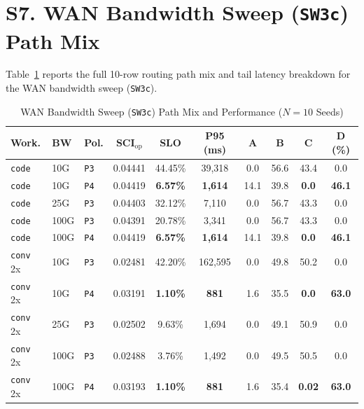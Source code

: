 \documentclass[11pt,a4paper]{article}
\begin{document}
\section*{S7. WAN Bandwidth Sweep (\texttt{SW3c}) Path Mix}
Table~\ref{tab:supp_wan_pathmix} reports the full 10-row routing path mix and tail latency breakdown for the WAN bandwidth sweep (\texttt{SW3c}).

\begin{table}[ht]
\centering
\scriptsize
\caption{WAN Bandwidth Sweep (\texttt{SW3c}) Path Mix and Performance ($N=10$ Seeds)}
\label{tab:supp_wan_pathmix}
\begin{tabular}{@{}lllccccccc@{}}
\toprule
\textbf{Work.} & \textbf{BW} & \textbf{Pol.} & $\textbf{SCI}_{\text{op}}$ & \textbf{SLO} & \textbf{P95 (ms)} & \textbf{A} & \textbf{B} & \textbf{C} & \textbf{D (\%)} \\
\midrule
\texttt{code} & 10G & \texttt{P3} & 0.04441 & 44.45\% & 39,318 & 0.0 & 56.6 & 43.4 & 0.0 \\
\texttt{code} & 10G & \texttt{P4} & 0.04419 & \textbf{6.57\%} & \textbf{1,614} & 14.1 & 39.8 & \textbf{0.0} & \textbf{46.1} \\
\texttt{code} & 25G & \texttt{P3} & 0.04403 & 32.12\% & 7,110 & 0.0 & 56.7 & 43.3 & 0.0 \\
\texttt{code} & 100G & \texttt{P3} & 0.04391 & 20.78\% & 3,341 & 0.0 & 56.7 & 43.3 & 0.0 \\
\texttt{code} & 100G & \texttt{P4} & 0.04419 & \textbf{6.57\%} & \textbf{1,614} & 14.1 & 39.8 & \textbf{0.0} & \textbf{46.1} \\
\midrule
\texttt{conv} 2x & 10G & \texttt{P3} & 0.02481 & 42.20\% & 162,595 & 0.0 & 49.8 & 50.2 & 0.0 \\
\texttt{conv} 2x & 10G & \texttt{P4} & 0.03191 & \textbf{1.10\%} & \textbf{881} & 1.6 & 35.5 & \textbf{0.0} & \textbf{63.0} \\
\texttt{conv} 2x & 25G & \texttt{P3} & 0.02502 & 9.63\% & 1,694 & 0.0 & 49.1 & 50.9 & 0.0 \\
\texttt{conv} 2x & 100G & \texttt{P3} & 0.02488 & 3.76\% & 1,492 & 0.0 & 49.5 & 50.5 & 0.0 \\
\texttt{conv} 2x & 100G & \texttt{P4} & 0.03193 & \textbf{1.10\%} & \textbf{881} & 1.6 & 35.4 & \textbf{0.02} & \textbf{63.0} \\
\bottomrule
\end{tabular}
\end{table}
\end{document}
